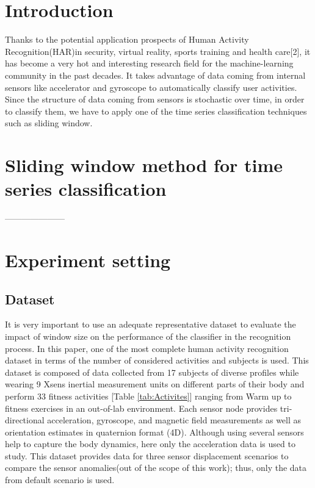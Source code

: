 \section{Introduction}
Thanks to the potential application prospects of Human Activity Recognition(HAR)in security, virtual reality, sports training and health care[2], it has become a very hot and interesting research field for the machine-learning community in the past decades. It takes advantage of data coming from internal sensors like accelerator and gyroscope to automatically classify user activities. Since the structure of data coming from sensors is stochastic over time, in order to classify them, we have to apply one of the time series classification techniques such as sliding window.

\section{Sliding window method for time series classification}

---------------------

\section{Experiment setting}

\subsection{Dataset} \label{sec:dataset}
It is very important to use an adequate representative dataset to evaluate the impact of window size on the performance of the classifier in the recognition process. In this paper, one of the most complete human activity recognition dataset \cite{banos2012benchmark} in terms of the number of considered activities and subjects is used. This dataset is composed of data collected from 17 subjects of diverse profiles while wearing 9 Xsens inertial measurement units on different parts of their body and perform 33 fitness activities [Table \ref{tab:Activites}] ranging from Warm up to fitness exercises in an out-of-lab environment. Each sensor node provides tri-directional acceleration, gyroscope, and magnetic field
measurements as well as orientation estimates in quaternion format (4D). Although using several sensors help to capture the body dynamics, here only the acceleration data is used to study. This dataset provides data for three sensor displacement scenarios to compare the sensor anomalies(out of the scope of this work); thus, only the data from default scenario is used.

